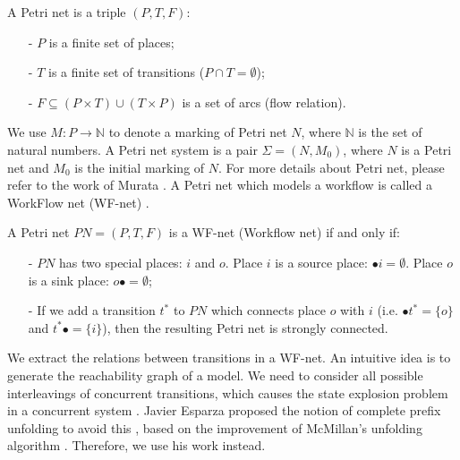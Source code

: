 \documentclass[dvips,...]{llncs}
\begin{document}
\begin{definition}\label{def:petrinet}
A Petri net is a triple $(P,T,F)$:
	\begin{itemize}
		\item[-] $P$ is a finite set of places;
		\item[-] $T$ is a finite set of transitions ($P\cap T=\emptyset$);
		\item[-] $F\subseteq(P\times T)\cup(T\times P)$ is a set of arcs (flow relation).
	\end{itemize}
\end{definition}

We use $M:P\rightarrow\mathbb{N}$ to denote a marking of Petri net $N$, where $\mathbb{N}$ is the set of natural numbers. A Petri net system is a pair $\Sigma=(N,M_{0})$, where $N$ is a Petri net and $M_{0}$ is the initial marking of $N$. For more details about Petri net, please refer to the work of Murata \cite{murata1989petri}. A Petri net which models a workflow is called a WorkFlow net (WF-net) \cite{van1998application}.

\begin{definition}[WF-net]\label{def:wfnet}
A Petri net $PN=(P,T,F)$ is a WF-net (Workflow net) if and only if:
	\begin{itemize}
		\item[-] $PN$ has two special places: $i$ and $o$. Place $i$ is a source place: $\bullet i=\emptyset$. Place $o$ is a sink place: $o\bullet =\emptyset$;
		\item[-] If we add a transition $t^{*}$ to $PN$ which connects place $o$ with $i$ (i.e. $\bullet t^{*}=\{o\}$ and $t^{*}\bullet=\{i\}$), then the resulting Petri net is strongly connected.
	\end{itemize}
\end{definition}

We extract the relations between transitions in a WF-net. An intuitive idea is to generate the reachability graph of a model. We need to consider all possible interleavings of concurrent transitions, which causes the state explosion problem in a concurrent system \cite{mcmillan1995technique}. Javier Esparza proposed the notion of complete prefix unfolding to avoid this \cite{esparza1996improvement}, based on the improvement of McMillan's unfolding algorithm \cite{mcmillan1995technique}. Therefore, we use his work instead.
\end{document}
